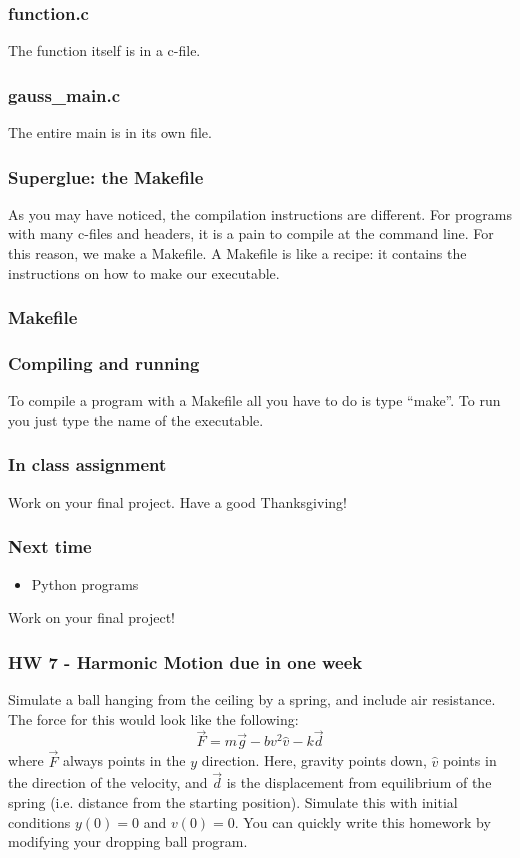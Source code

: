 \documentclass{beamer}
\begin{document}
\begin{frame}[fragile]
  \frametitle{function.c}
  The function itself is in a c-file.
  
\end{frame}

\begin{frame}[fragile]
  \frametitle{gauss\_main.c}
  The entire main is in its own file.
  
\end{frame}

\begin{frame}
  \frametitle{Superglue: the Makefile}
  As you may have noticed, the compilation instructions are different.
  For programs with many c-files and headers, it is a pain to compile
  at the command line. For this reason, we make a Makefile. A Makefile
  is like a recipe: it contains the instructions on how to make
  our executable.
\end{frame}

\begin{frame}
  \frametitle{Makefile}
  
\end{frame}

\begin{frame}
  \frametitle{Compiling and running}
  To compile a program with a Makefile all you have to do is type ``make''.
  To run you just type the name of the executable.
\end{frame}

\begin{frame}
  \frametitle{In class assignment}
  Work on your final project. Have a good Thanksgiving!
\end{frame}

\begin{frame}
  \frametitle{Next time}
  \begin{itemize}
  \item Python programs
  \end{itemize}
  Work on your final project!
\end{frame}

\begin{frame}
  \frametitle{HW 7 - Harmonic Motion due in one week}
  Simulate a ball hanging from the ceiling by a spring, 
  and include air resistance.
  The force for this would look like the following:
  \begin{equation*}
    \vec{F} = m\vec{g} - bv^2\hat{v} - k\vec{d}
  \end{equation*}
  where $\vec{F}$ always points in the $y$ direction. Here,
  gravity points down, $\hat{v}$ points in the direction
  of the velocity, and $\vec{d}$ is the displacement from
  equilibrium of the spring (i.e. distance from the starting position).
  Simulate this with initial conditions $y(0)=0$ and $v(0)=0$.
  You can quickly write this homework by modifying your dropping ball program.
\end{frame}
\end{document}
